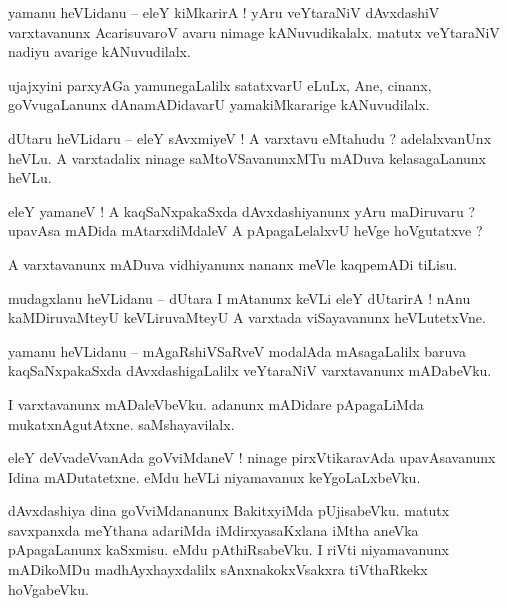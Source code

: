 \documentclass{article}
\begin{document}
\begin{mn}%
yamanu heVLidanu -- eleY kiMkarirA ! yAru veYtaraNiV dAvxdashiV varxtavanunx AcarisuvaroV avaru 
nimage kANuvudikalalx. matutx veYtaraNiV nadiyu avarige kANuvudilalx.
\end{mn}

\begin{mn}%
ujajxyini parxyAGa yamunegaLalilx satatxvarU eLuLx, Ane, cinanx, goVvugaLanunx dAnamADidavarU 
yamakiMkararige kANuvudilalx.
\end{mn}

\begin{mn}%
dUtaru heVLidaru -- eleY sAvxmiyeV ! A varxtavu eMtahudu ? adelalxvanUnx heVLu. A varxtadalix 
ninage saMtoVSavanunxMTu mADuva kelasagaLanunx heVLu.
\end{mn}

\begin{mn}%
eleY yamaneV ! A kaqSaNxpakaSxda dAvxdashiyanunx yAru maDiruvaru ? upavAsa mADida mAtarxdiMdaleV A 
pApagaLelalxvU heVge hoVgutatxve ?
\end{mn}

\begin{mn}%
A varxtavanunx mADuva vidhiyanunx nananx meVle kaqpemADi tiLisu.
\end{mn}

\begin{mn}%
mudagxlanu heVLidanu -- dUtara I mAtanunx keVLi eleY dUtarirA ! nAnu kaMDiruvaMteyU keVLiruvaMteyU 
A varxtada viSayavanunx heVLutetxVne.
\end{mn}

\begin{mn}%
yamanu heVLidanu -- mAgaRshiVSaRveV modalAda mAsagaLalilx baruva kaqSaNxpakaSxda dAvxdashigaLalilx 
veYtaraNiV varxtavanunx mADabeVku.
\end{mn}

\begin{mn}%
I varxtavanunx mADaleVbeVku. adanunx mADidare pApagaLiMda mukatxnAgutAtxne. saMshayavilalx.
\end{mn}

\begin{mn}%
eleY deVvadeVvanAda goVviMdaneV ! ninage pirxVtikaravAda upavAsavanunx Idina mADutatetxne. eMdu 
heVLi niyamavanux keYgoLaLxbeVku.
\end{mn}

\begin{mn}%
dAvxdashiya dina goVviMdananunx BakitxyiMda pUjisabeVku. matutx savxpanxda meYthana adariMda 
iMdirxyasaKxlana iMtha aneVka pApagaLanunx kaSxmisu. eMdu pAthiRsabeVku. I riVti niyamavanunx 
mADikoMDu madhAyxhayxdalilx sAnxnakokxVsakxra tiVthaRkekx hoVgabeVku.
\end{mn}
\end{document}
